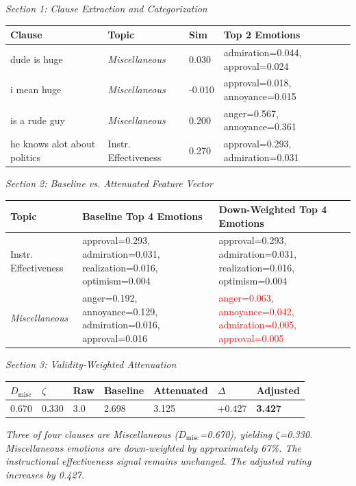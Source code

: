 \documentclass{article}
\begin{document}
\thispagestyle{empty}

\noindent\textit{Section 1: Clause Extraction and Categorization}

\vspace{0.3em}
\noindent
\begin{tabular}{p{7cm} p{3.5cm} p{1cm} p{5.5cm}}
\toprule
\textbf{Clause} & \textbf{Topic} & \textbf{Sim} & \textbf{Top 2 Emotions} \\
\midrule
dude is huge & \textit{Miscellaneous} & 0.030 & admiration=0.044, approval=0.024 \\
\addlinespace
i mean huge & \textit{Miscellaneous} & -0.010 & approval=0.018, annoyance=0.015 \\
\addlinespace
is a rude guy & \textit{Miscellaneous} & 0.200 & anger=0.567, annoyance=0.361 \\
\addlinespace
he knows alot about politics & Instr. Effectiveness & 0.270 & approval=0.293, admiration=0.031 \\
\bottomrule
\end{tabular}

\vspace{0.8em}
\noindent\textit{Section 2: Baseline vs. Attenuated Feature Vector}

\vspace{0.3em}
\noindent
\begin{tabular}{p{3.5cm} p{7cm} p{7cm}}
\toprule
\textbf{Topic} & \textbf{Baseline Top 4 Emotions} & \textbf{Down-Weighted Top 4 Emotions}  \\
\midrule
Instr. Effectiveness & approval=0.293, admiration=0.031, realization=0.016, optimism=0.004 & approval=0.293, admiration=0.031, realization=0.016, optimism=0.004 \\
\addlinespace
\textit{Miscellaneous} & anger=0.192, annoyance=0.129, admiration=0.016, approval=0.016 & \textcolor{red}{anger=0.063, annoyance=0.042, admiration=0.005, approval=0.005} \\
\bottomrule
\end{tabular}

\vspace{0.8em}
\noindent\textit{Section 3: Validity-Weighted Attenuation}

\vspace{0.3em}
\noindent
\begin{tabular}{p{2cm} p{2cm} p{2cm} p{2.5cm} p{2.5cm} p{2cm} p{2.5cm}}
\toprule
$D_{\text{misc}}$ & $\zeta$ & \textbf{Raw} & \textbf{Baseline} & \textbf{Attenuated} & $\Delta$ & \textbf{Adjusted} \\
\midrule
0.670 & 0.330 & 3.0 & 2.698 & 3.125 & +0.427 & \textbf{3.427} \\
\bottomrule
\end{tabular}

\vspace{0.5em}
\small\textit{Three of four clauses are Miscellaneous ($D_{\text{misc}}$=0.670), yielding $\zeta$=0.330. Miscellaneous emotions are down-weighted by approximately 67\%. The instructional effectiveness signal remains unchanged. The adjusted rating increases by 0.427.}
\end{document}
